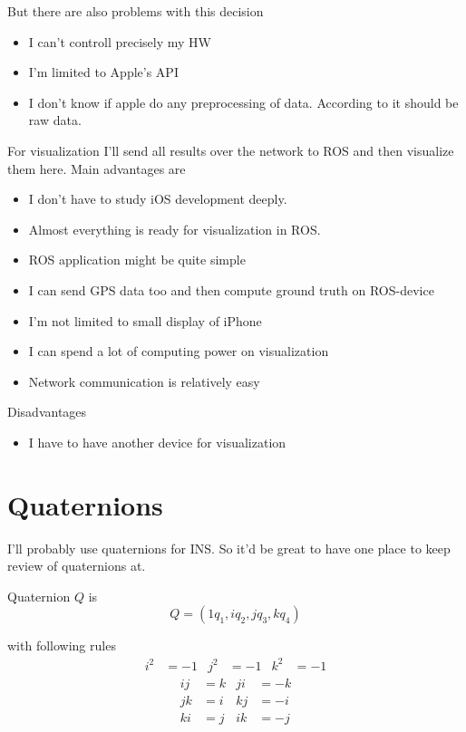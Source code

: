 But there are also problems with this decision
\begin{itemize}
\item I can't controll precisely my HW
\item I'm limited to Apple's API
\item I don't know if apple do any preprocessing of data. According to \cite{apple-event-handling-guide-for-ios} it should be raw data.
\end{itemize}

For visualization I'll send all results over the network to ROS and then visualize them here. Main advantages are

\begin{itemize}
\item I don't have to study iOS development deeply.
\item Almost everything is ready for visualization in ROS.
\item ROS application might be quite simple
\item I can send GPS data too and then compute ground truth on ROS-device
\item I'm not limited to small display of iPhone
\item I can spend a lot of computing power on visualization
\item Network communication is relatively easy
\end{itemize}

Disadvantages
\begin{itemize}
\item I have to have another device for visualization
\end{itemize}



\section{Quaternions}

I'll probably use quaternions for INS. So it'd be great to have one place to keep review of quaternions at.

Quaternion $Q$ is
$$Q = \left( 1 q_1, i q_2, j q_3, k q_4 \right)$$

with following rules
\begin{align}
\label{eqn:quaternion-properties-1}
i^2 &= -1 & j^2 &= -1 & k^2 &= -1
\end{align}
\begin{equation}
\begin{align*}
\label{eqn:quaternion-properties-2}
i j &= k & j i &= -k \\
j k &= i & k j &= -i \\
k i &= j & i k &= -j
\end{align*}
\end{equation}


